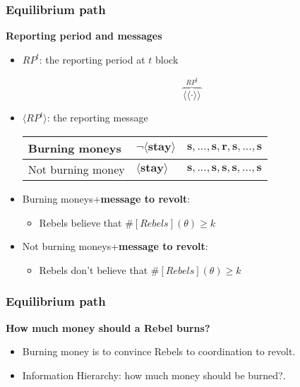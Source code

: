 \documentclass[10pt]{beamer}
\begin{document}
\begin{frame}
\frametitle{Equilibrium path}

\textbf{Reporting period and messages}

\begin{itemize}
\item $RP^t$: the reporting period at $t$ block

\[\overbrace{\langle \langle \cdot \rangle \rangle}^{RP^t}\] 

\item $\langle RP^t \rangle$: the reporting message
\begin{table}[h]
\begin{tabular}{l l l}
\alert{Burning moneys} & $\neg\langle \textbf{stay} \rangle$ & $\textbf{s},...,\textbf{s},{\textbf{r},\textbf{s},...,\textbf{s}}$ \\
\hline
\alert{Not burning money} & $\langle \textbf{stay} \rangle$ & $\textbf{s},...,\textbf{s},\textbf{s},\textbf{s},...,\textbf{s}$  \\

\end{tabular}
\end{table}
\item \alert{Burning moneys}+\textbf{message to revolt}: 
\begin{itemize}
\item Rebels believe that $\#[Rebels](\theta)\geq k$
\end{itemize}

\item \alert{Not burning moneys}+\textbf{message to revolt}: 

\begin{itemize}
\item Rebels don't believe that $\#[Rebels](\theta)\geq k$
\end{itemize}

\end{itemize}
\end{frame}





\begin{frame}
\frametitle{Equilibrium path}

\textbf{How much money should a Rebel burns?}

\begin{itemize}
\item Burning money is to convince Rebels to {coordination to revolt}.
\item \alert{Information Hierarchy}: how much money should be burned?.
\end{itemize}

\end{frame}
\end{document}
